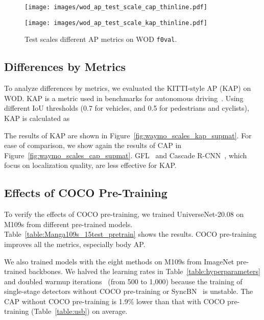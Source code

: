 \documentclass[10pt,twocolumn,letterpaper]{article}
\newcommand{\OurAugust}{UniverseNet-20.08\xspace}
\newcommand{\MangasAbbr}{M109s\xspace}
\begin{document}
\begin{figure}[t]
	\centering
	\begin{minipage}[b]{0.98\linewidth}
		\centering
		\texttt{[image: images/wod\_ap\_test\_scale\_cap\_thinline.pdf]}
		\vspace{-6mm}
		\label{fig:waymo_scales_cap_supmat}
		\vspace{2mm}
	\end{minipage}
	\begin{minipage}[b]{0.98\linewidth}
		\centering
		\texttt{[image: images/wod\_ap\_test\_scale\_kap\_thinline.pdf]}
		\vspace{-6mm}
		\label{fig:waymo_scales_kap_supmat}
	\end{minipage}
	\caption{
		Test scales \vs different AP metrics on WOD \texttt{f0val}.
	}
	\label{fig:waymo_scales_supmat}
\end{figure}

\subsection{Differences by Metrics}
To analyze differences by metrics,
we evaluated the KITTI-style AP (KAP) on WOD.
KAP is a metric used in benchmarks for autonomous driving~\cite{KITTI_CVPR2012, WaymoOpenDataset_CVPR2020}.
Using different IoU thresholds (0.7 for vehicles, and 0.5 for pedestrians and cyclists),
KAP is calculated as

The results of KAP are shown in Figure~\ref{fig:waymo_scales_kap_supmat}.
For ease of comparison, we show again the results of CAP in Figure~\ref{fig:waymo_scales_cap_supmat}.
GFL~\cite{GFL_NeurIPS2020} and Cascade R-CNN~\cite{Cascade_R-CNN_CVPR2018}, which focus on localization quality, are less effective for KAP. 





\subsection{Effects of COCO Pre-Training}

To verify the effects of COCO pre-training,
we trained \OurAugust on \MangasAbbr from different pre-trained models.
Table~\ref{table:Manga109s_15test_pretrain} shows the results.
COCO pre-training improves all the metrics, especially body AP.

We also trained models with the eight methods on \MangasAbbr from ImageNet pre-trained backbones.
We halved the learning rates in Table~\ref{table:hyperparameters} and doubled warmup iterations~\cite{Goyal2017AccurateLM} (from 500 to 1,000)
because the training of single-stage detectors without COCO pre-training or SyncBN~\cite{MegDet_CVPR2018} is unstable.
The CAP without COCO pre-training is 1.9\% lower than that with COCO pre-training (Table~\ref{table:usb}) on average.
\end{document}

